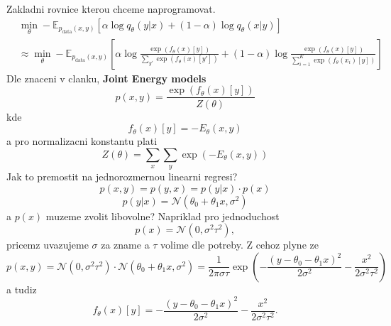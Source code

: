 \documentclass[a4paper, 11pt]{article}
\begin{document}
Zakladni rovnice kterou chceme naprogramovat.
\begin{align}\label{q1q2final}
&\min_{\theta}- \mathbb{E}_{p_{\mathrm{data}}(x,y)}\left[\alpha\log q_{\theta}\left(y|x\right)+ \left(1-\alpha\right)\log q_{\theta}\left(x|y\right) \right]  \\
&\approx	\min_{\theta}- \mathbb{E}_{p_{\mathrm{data}}(x,y)}\left[\alpha\log \frac{\exp\left({f_\theta\left(x\right)[y]}\right)}{\sum_{y'}\exp\left({f_\theta\left(x\right)[y']}\right)}+ \left(1-\alpha\right)\log \frac{\exp\left({f_\theta\left(x\right)[y]}\right)}{\sum_{i=1}^K\exp\left({f_\theta\left(x_i\right)[y]}\right)} \right]
\end{align}
Dle znaceni v clanku, \textbf{Joint Energy models}  
\begin{equation}
	p(x,y) = \frac{\exp{\left(f_{\theta}(x)[y]\right)}}{Z(\theta)}
\end{equation}
kde 
\begin{equation}
f_{\theta}(x)[y] = -E_{\theta}(x,y) 
\end{equation}
a pro normalizacni konstantu plati 
\begin{equation}
	Z(\theta) = \sum_x\sum_y\exp{(-E_{\theta}(x,y))} 
\end{equation}
Jak to premostit na jednorozmernou linearni regresi?
\begin{equation}
p(x,y) =	p(y,x) = p(y\vert x)\cdot p(x)
\end{equation}
\begin{equation}
	p(y\vert x) = \mathcal{N}\left(\theta_0 + \theta_1x, \sigma^2 \right)
\end{equation}
a $p(x)$ muzeme zvolit libovolne? Napriklad pro jednoduchost 
\begin{equation}
	p(x) = \mathcal{N}\left(0, \sigma^2\tau^2\right),
\end{equation}
pricemz uvazujeme $\sigma$ za zname a $\tau$ volime dle potreby. Z cehoz plyne ze 
\begin{equation}
p(x,y) = \mathcal{N}\left(0, \sigma^2\tau^2\right) \cdot \mathcal{N}\left(\theta_0 + \theta_1x, \sigma^2 \right)  =  \frac{1}{2\pi\sigma\tau}\exp\left(-\frac{(y-\theta_0-\theta_1x)^2}{2\sigma^2}-\frac{x^2}{2\sigma^2\tau^2}\right)
\end{equation}
a tudiz
\begin{equation}
	f_{\theta}(x)[y] = -\frac{(y-\theta_0-\theta_1x)^2}{2\sigma^2} - \frac{x^2}{2\sigma^2\tau^2}.
\end{equation}
\end{document}

